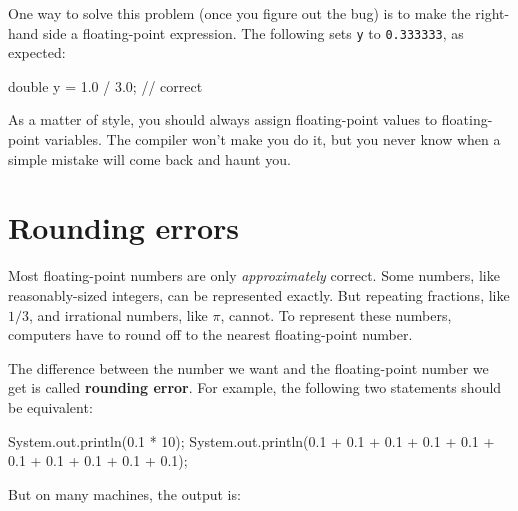 \documentclass[12pt]{book}
\theoremstyle{exercise}
\newcommand{\java}[1]{\verb"#1"}
\begin{document}
One way to solve this problem (once you figure out the bug) is to make the right-hand side a floating-point expression.
The following sets \java{y} to \java{0.333333}, as expected:

\begin{code}
    double y = 1.0 / 3.0;  // correct
\end{code}

As a matter of style, you should always assign floating-point values to floating-point variables.
The compiler won't make you do it, but you never know when a simple mistake will come back and haunt you.


\section{Rounding errors}



Most floating-point numbers are only {\em approximately} correct.
Some numbers, like reasonably-sized integers, can be represented exactly.
But repeating fractions, like $1/3$, and irrational numbers, like $\pi$, cannot.
To represent these numbers, computers have to round off to the nearest floating-point number.



The difference between the number we want and the floating-point number we get is called {\bf rounding error}.
For example, the following two statements should be equivalent:

\begin{code}
    System.out.println(0.1 * 10);
    System.out.println(0.1 + 0.1 + 0.1 + 0.1 + 0.1
                     + 0.1 + 0.1 + 0.1 + 0.1 + 0.1);
\end{code}

But on many machines, the output is:
\end{document}
